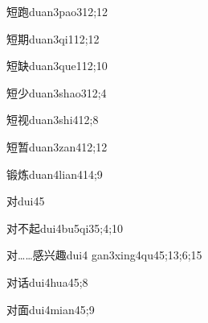 \begin{verbete}{短跑}{duan3pao3}{12;12}
\end{verbete}

\begin{verbete}{短期}{duan3qi1}{12;12}
\end{verbete}

\begin{verbete}{短缺}{duan3que1}{12;10}
\end{verbete}

\begin{verbete}{短少}{duan3shao3}{12;4}
\end{verbete}

\begin{verbete}{短视}{duan3shi4}{12;8}
\end{verbete}

\begin{verbete}{短暂}{duan3zan4}{12;12}
\end{verbete}

\begin{verbete}{锻炼}{duan4lian4}{14;9}
\end{verbete}

\begin{verbete}{对}{dui4}{5}
\end{verbete}

\begin{verbete}{对不起}{dui4bu5qi3}{5;4;10}
\end{verbete}

\begin{verbete}{对……感兴趣}{dui4 gan3xing4qu4}{5;13;6;15}
\end{verbete}

\begin{verbete}{对话}{dui4hua4}{5;8}
\end{verbete}

\begin{verbete}{对面}{dui4mian4}{5;9}
\end{verbete}

